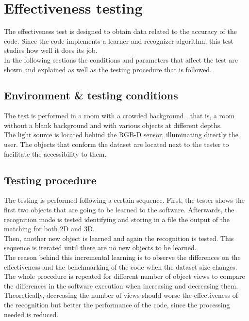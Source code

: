 \section{Effectiveness testing}

	The effectiveness test is designed to obtain data related to the accuracy of the code. Since the code implements a learner and recognizer algorithm, this test studies how well it does its job. 
	\\

	In the following sections the conditions and parameters that affect the test are shown and explained as well as the testing procedure that is followed. \\[0.5cm]

	\subsection{Environment \& testing conditions}
		The test is performed in a room with a crowded background , that is, a room without a blank background and with various objects at different depths.
		\\

		The light source is located behind the RGB-D sensor, illuminating directly the user. The objects that conform the dataset are located next to the tester to facilitate the accessibility to them. \\[0.5cm]

	\subsection{Testing procedure}
		The testing is performed following a certain sequence. First, the tester shows the first two objects that are going to be learned to the software. Afterwards, the recognition mode is tested identifying and storing in a file the output of the matching for both 2D and 3D. 
		\\

		Then, another new object is learned and again the recognition is tested. This sequence is iterated until there are no new objects to be learned. 
		\\

		The reason behind this incremental learning is to observe the differences on the effectiveness and the benchmarking of the code when the dataset size changes. 
		\\

		The whole procedure is repeated for different number of object views to compare the differences in the software execution when increasing and decreasing them. Theoretically, decreasing the number of views should worse the effectiveness of the recognition but better the performance of the code, since the processing needed is reduced.\\[0.5cm]

